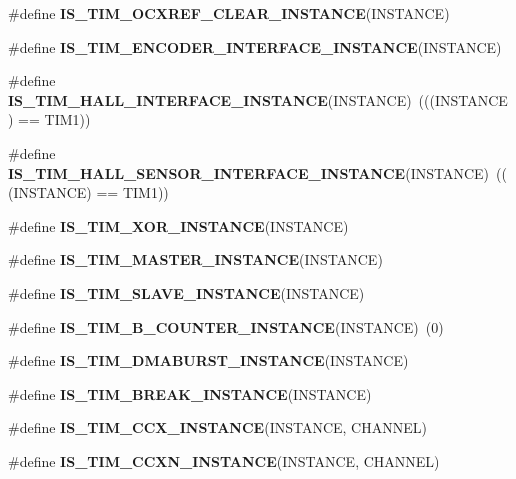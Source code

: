 \begin{DoxyCompactItemize}
\item 
\#define {\bfseries I\+S\+\_\+\+T\+I\+M\+\_\+\+O\+C\+X\+R\+E\+F\+\_\+\+C\+L\+E\+A\+R\+\_\+\+I\+N\+S\+T\+A\+N\+CE}(I\+N\+S\+T\+A\+N\+CE)
\item 
\#define {\bfseries I\+S\+\_\+\+T\+I\+M\+\_\+\+E\+N\+C\+O\+D\+E\+R\+\_\+\+I\+N\+T\+E\+R\+F\+A\+C\+E\+\_\+\+I\+N\+S\+T\+A\+N\+CE}(I\+N\+S\+T\+A\+N\+CE)
\item 
\mbox{\label{group___exported__macro_gacdcc047699e2d83c9d2b3a3f8375dff4}} 
\#define {\bfseries I\+S\+\_\+\+T\+I\+M\+\_\+\+H\+A\+L\+L\+\_\+\+I\+N\+T\+E\+R\+F\+A\+C\+E\+\_\+\+I\+N\+S\+T\+A\+N\+CE}(I\+N\+S\+T\+A\+N\+CE)~(((I\+N\+S\+T\+A\+N\+CE) == T\+I\+M1))
\item 
\mbox{\label{group___exported__macro_ga979ea18ba0931f5ed15cc2f3ac84794b}} 
\#define {\bfseries I\+S\+\_\+\+T\+I\+M\+\_\+\+H\+A\+L\+L\+\_\+\+S\+E\+N\+S\+O\+R\+\_\+\+I\+N\+T\+E\+R\+F\+A\+C\+E\+\_\+\+I\+N\+S\+T\+A\+N\+CE}(I\+N\+S\+T\+A\+N\+CE)~(((I\+N\+S\+T\+A\+N\+CE) == T\+I\+M1))
\item 
\#define {\bfseries I\+S\+\_\+\+T\+I\+M\+\_\+\+X\+O\+R\+\_\+\+I\+N\+S\+T\+A\+N\+CE}(I\+N\+S\+T\+A\+N\+CE)
\item 
\#define {\bfseries I\+S\+\_\+\+T\+I\+M\+\_\+\+M\+A\+S\+T\+E\+R\+\_\+\+I\+N\+S\+T\+A\+N\+CE}(I\+N\+S\+T\+A\+N\+CE)
\item 
\#define {\bfseries I\+S\+\_\+\+T\+I\+M\+\_\+\+S\+L\+A\+V\+E\+\_\+\+I\+N\+S\+T\+A\+N\+CE}(I\+N\+S\+T\+A\+N\+CE)
\item 
\mbox{\label{group___exported__macro_gac41867bf288927ff8ff10a85e67a591b}} 
\#define {\bfseries I\+S\+\_\+\+T\+I\+M\+\_\+B\+\_\+\+C\+O\+U\+N\+T\+E\+R\+\_\+\+I\+N\+S\+T\+A\+N\+CE}(I\+N\+S\+T\+A\+N\+CE)~(0)
\item 
\#define {\bfseries I\+S\+\_\+\+T\+I\+M\+\_\+\+D\+M\+A\+B\+U\+R\+S\+T\+\_\+\+I\+N\+S\+T\+A\+N\+CE}(I\+N\+S\+T\+A\+N\+CE)
\item 
\#define {\bfseries I\+S\+\_\+\+T\+I\+M\+\_\+\+B\+R\+E\+A\+K\+\_\+\+I\+N\+S\+T\+A\+N\+CE}(I\+N\+S\+T\+A\+N\+CE)
\item 
\#define {\bfseries I\+S\+\_\+\+T\+I\+M\+\_\+\+C\+C\+X\+\_\+\+I\+N\+S\+T\+A\+N\+CE}(I\+N\+S\+T\+A\+N\+CE,  C\+H\+A\+N\+N\+EL)
\item 
\#define {\bfseries I\+S\+\_\+\+T\+I\+M\+\_\+\+C\+C\+X\+N\+\_\+\+I\+N\+S\+T\+A\+N\+CE}(I\+N\+S\+T\+A\+N\+CE,  C\+H\+A\+N\+N\+EL)

\end{DoxyCompactItemize}
